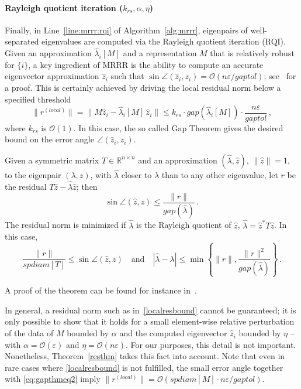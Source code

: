 \documentclass[final]{siamltex}
\newcommand{\R}{\mathbb{R}}
\newcommand{\Rnn}{\R^{n \times n}}
\newcommand\norm[1]{\lVert#1\rVert}
\newcommand\order[1]{\mathcal{O}(#1)}
\begin{document}
\paragraph{Rayleigh quotient iteration ($k_{rs}, \alpha, \eta$)}

Finally, in Line~\ref{line:mrrr:rqi} of Algorithm~\ref{alg:mrrr}, eigenpairs of well-separated
eigenvalues are computed via the Rayleigh quotient iteration (RQI).  
Given an approximation $\hat{\lambda}_i[M]$ and a representation $M$ that
is relatively robust for $\{i\}$, a key ingredient of MRRR is the ability to
compute an accurate eigenvector approximation $\hat{z}_i$ such that $\sin
\angle(\hat{z}_i,z_i) = \order{n\varepsilon/gaptol}$; see~\cite{Dhillon:2004:Ortvecs} for a
proof. This is certainly achieved by driving the local residual 
norm below a specified threshold
\begin{equation}
\norm{r^{(local)}} = \norm{M \hat{z}_i -
  \hat{\lambda}_i[M]\,\hat{z}_i} \leq k_{rs}  \cdot
gap\left(\hat{\lambda}_i[M]\right) \cdot \frac{n \varepsilon}{gaptol} \,,
\label{localresbound}
\end{equation}
where $k_{rs}$ is $\order{1}$. 
In this case, the so called Gap Theorem gives the desired bound on the error
angle $\angle(\hat{z}_i,z_i)$. 
\begin{theorem}
Given a symmetric matrix $T \in \Rnn$ and an approximation $(\hat{\lambda},
\hat{z})$, $\| \hat{z} \| = 1$, 
to the eigenpair $(\lambda,
z)$, with $\hat{\lambda}$ closer to $\lambda$ than to any other eigenvalue,
let $r$ 
be the residual $T \hat{z} -
\hat{\lambda} \hat{z}$; then
\begin{equation}
\sin \angle (\hat{z},z) \leq \frac{\| r \|}{gap(\hat{\lambda})} \,.
\label{eq:gapthmmain}
\end{equation}
The residual norm is minimized if $\hat{\lambda}$ is the Rayleigh quotient
of $\hat{z}$, $\hat{\lambda} = \hat{z}^* T \hat{z}$. In 
this case, 
\begin{equation}
\frac{\| r \|}{spdiam[T]} \leq \sin \angle (\hat{z},z)  \quad
\mbox{and} \quad |\hat{\lambda} - \lambda| \leq \min \left\{
 \norm{r}, \frac{\norm{r}^2}{gap(\hat{\lambda})} \right\} \,.
\label{eq:gapthmeq2}
 \end{equation}
\label{thm:gapthm}
\end{theorem}
A proof of the theorem can be found for instance in~\cite{Parlett:1998:SEP,Willems:Diss}. 

In general, a residual norm such as in~\eqref{localresbound} cannot be guaranteed; it is only
possible to show that it holds for a small element-wise relative
perturbation of the data of $M$ bounded by $\alpha$ and the computed
eigenvector $\hat{z}_i$ bounded by $\eta$ -- with $\alpha = \order{\varepsilon}$ and
$\eta = \order{n \varepsilon}$. For our purposes, this
detail is not important. 
Nonetheless, Theorem~\ref{resthm} takes
this fact into account. Note that even in rare cases where \eqref{localresbound} is not
fulfilled, the small error angle together with \eqref{eq:gapthmeq2} imply
$\norm{r^{(local)}} = \order{spdiam[M] \cdot n\varepsilon/gaptol}$.
\end{document}
